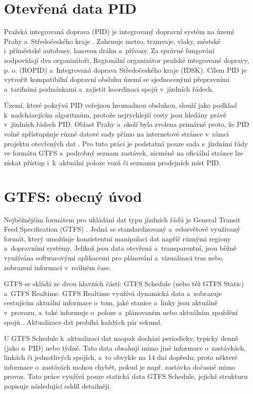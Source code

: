 \section{Otevřená data PID}
\label{opendata}
Pražská integrovaná doprava (PID) je integrovaný dopravní systém na území Prahy a~Středočeského kraje \cite{PIDoSystemu}. Zahrnuje metro, tramvaje, vlaky, městské i~příměstské autobusy, lanovou dráhu a~přívozy. Za správné fungování zodpovídají dva organizátoři, Regionální organizátor pražské integrované dopravy, p. o. (ROPID) a~Integrovaná doprava Středočeského kraje (IDSK). Cílem PID je vytvořit kompatibilní dopravní obsluhu území se sjednocenými přepravními a~tarifními podmínkami a~zajistit koordinaci spojů v~jízdních řádech. 

Území, které pokrývá PID veřejnou hromadnou obsluhou, slouží jako podklad k~nadcházejícím algoritmům, protože nejrychlejší cesty jsou hledány právě v~jízdních řádech PID. Oblast Prahy a~okolí byla zvolena primárně proto, že PID volně zpřístupňuje různé datové sady přímo na internetové stránce v~rámci projektu otevřených dat \cite{PIDOPENDATA}. Pro tuto práci je podstatná pouze sada s~jízdními řády ve formátu GTFS a~podrobný seznam zastávek, nicméně na oficiální stránce lze získat přístup i~k~aktuální poloze vozů či seznamu prodejních míst PID.

\section{GTFS: obecný úvod}
Nejběžnějším formátem pro ukládání dat typu jízdních řádů je General Transit Feed Specification (GTFS) \cite{gtfsStarted}. Jedná se standardizovaný a~celosvětově využívaný formát, který umožňuje konzistentní manipulaci dat napříč různými regiony a~dopravními systémy. Jelikož jsou data otevřená a~transparentní, jsou běžně využívána softwarovými aplikacemi pro plánování a~vizualizaci tras nebo zobrazení informací v~reálném čase.

GTFS se skládá ze dvou hlavních částí: GTFS Schedule (nebo též GTFS Static) a~GTFS Realtime. GTFS Realtime využívá dynamická data a~zobrazuje cestujícím aktuální informace o~tom, jaké stanice a~linky jsou aktuálně v~provozu, a~také informuje o~poloze a~plánovaném nebo aktuálním zpoždění spojů \cite{gtfsDocumentation}. Aktualizace dat probíhá každých pár sekund.

U GTFS Schedule k~aktualizaci dat naopak dochází periodicky, typicky denně (jako u~PID) nebo týdně. Tato data obsahují mimo jiné informace o~zastávkách, linkách či jednotlivých spojích, a~to obvykle na 14 dní dopředu; proto některé informace o~zastávách mohou chybět, pokud je např. zastávka dočasně mimo provoz. Tato práce využívá pouze statická data GTFS Schedule, jejichž strukturu popisuje následující oddíl detailněji.

